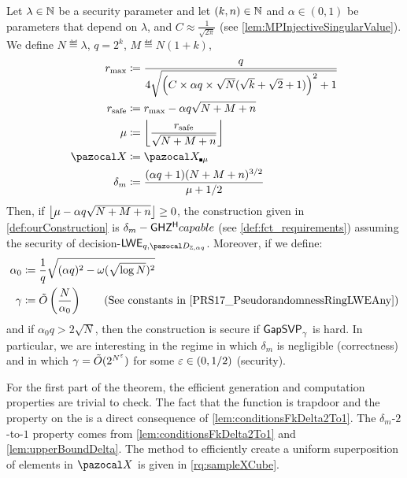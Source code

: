{  \begin{lemmaE}\label{th:conditionsParam}
    Let $\lambda \in \N$ be a security parameter and let $(k,n) \in \N$ and $\alpha \in (0,1)$ be parameters that depend on $\lambda$, and $C \approx \frac{1}{\sqrt{2\pi}}$ (see \cref{lem:MPInjectiveSingularValue}). We define $N \eqdef \lambda$, $q=2^k$, $M \eqdef N(1+k)$,
    \begingroup
    \allowdisplaybreaks
    \begin{align}
      r_{\max} &\eqdef \frac{q}{4\sqrt{\left(C \times \alpha q \times \sqrt{N}(\sqrt{k}+\sqrt{2}+1)\right)^2 + 1}}\\
      \rsafe &\eqdef r_{\max} - \alpha q \sqrt{N+M+n}\\
      \mu &\eqdef \floor*{\frac{\rsafe}{\sqrt{N+M+n}}}\\
      \ccX &\eqdef \ccXCube[\mu]\\
      \delta_m &\eqdef \frac{(\alpha q + 1)(N+M+n)^{3/2}}{\mu+1/2}
    \end{align}
    \endgroup
    Then, if $\floor*{\mu  - \alpha q \sqrt{N+M+n}} \geq 0$, the construction given in \cref{def:ourConstruction} is $\delta_m-\AssumpFctNoDelta$ (see \cref{def:fct_requirements}) assuming the security of decision-$\LWE{}_{q,\disGaussAQ}$. Moreover, if we define:
    \begingroup
    \allowdisplaybreaks
    \begin{align}
      \alpha_0 &\eqdef \frac{1}{q} \sqrt{(\alpha q)^2 - \omega(\sqrt{\log N})^2}\\
      \gamma &\eqdef \tilde{O}\left(\frac{N}{\alpha_0}\right) \tag{See constants in \cite{PRS17_PseudorandomnessRingLWEAny}}
    \end{align}
    \endgroup
    and if $\alpha_0 q > 2\sqrt{N}$, then the construction is secure if $\GapSVP_\gamma$ is hard. In particular, we are interesting in the regime in which $\delta_m$ is negligible (correctness) and in which $\gamma = \tilde{O}(2^{N^\eps})$ for some $\eps \in (0,1/2)$ (security).
  \end{lemmaE}
  \begin{proofE}
    For the first part of the theorem, the efficient generation and computation properties are trivial to check. The fact that the function is trapdoor and the property on the \XOR{} is a direct consequence of \cref{lem:conditionsFkDelta2To1}. The $\delta_m$-$2$-to-$1$ property comes from \cref{lem:conditionsFkDelta2To1} and \cref{lem:upperBoundDelta}. The method to efficiently create a uniform superposition of elements in $\ccX$ is given in \cref{rq:sampleXCube}.


\end{proofE}}
